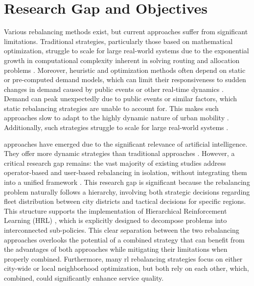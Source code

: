 \section{Research Gap and Objectives}\label{sec:introduction-reserach_gap}
Various rebalancing methods exist, but current approaches suffer from significant limitations.
Traditional strategies, particularly those based on mathematical optimization, struggle to scale for large real-world systems due to the exponential growth in computational complexity inherent in solving routing and allocation problems \cite{wu_challenges_2020, jimenez-merono_optimization_2024}.
Moreover, heuristic and optimization methods often depend on static or pre-computed demand models, which can limit their responsiveness to sudden changes in demand caused by public events or other real-time dynamics \cite{jimenez-merono_optimization_2024}.
Demand can peak unexpectedly due to public events or similar factors, which static rebalancing strategies are unable to account for.
This makes such approaches slow to adapt to the highly dynamic nature of urban mobility \cite{jimenez-merono_optimization_2024}.
Additionally, such strategies struggle to scale for large real-world systems \cite{wu_challenges_2020}.

 approaches have emerged due to the significant relevance of artificial intelligence.
They offer more dynamic strategies than traditional approaches \cite{chouaki_review_2025}.
However, a critical research gap remains: the vast majority of existing studies address operator-based and user-based rebalancing in isolation, without integrating them into a unified framework \cite{emami_integrated_2024}.
This research gap is significant because the rebalancing problem naturally follows a hierarchy, involving both strategic decisions regarding fleet distribution between city districts and tactical decisions for specific regions.
This structure supports the implementation of Hierarchical Reinforcement Learning (HRL) \cite{pateria_hierarchical_2021}, which is explicitly designed to decompose problems into interconnected sub-policies.
This clear separation between the two rebalancing approaches overlooks the potential of a combined strategy that can benefit from the advantages of both approaches while mitigating their limitations when properly combined.
Furthermore, many \gls{rl} rebalancing strategies focus on either city-wide \cite{skordilis_modular_2021} or local neighborhood \cite{li_dynamic_2018} optimization, but both rely on each other, which, combined, could significantly enhance service quality.\\

